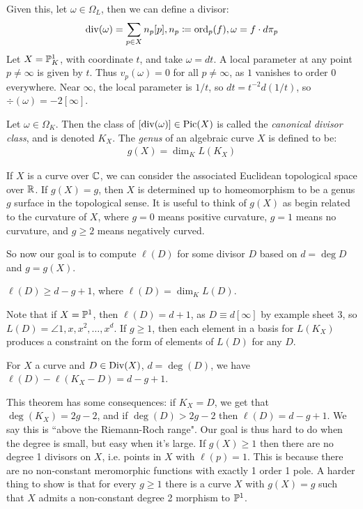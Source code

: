 \documentclass[10pt,a4paper,rgb]{article}
\begin{document}
Given this, let $\omega \in \Omega_L$, then we can define a divisor:
\begin{align*}
\div(\omega) = \sum_{p \in X} n_p[p], n_p \coloneqq \ord_p(f), \omega = f\cdot d\pi_p
\end{align*}
\hspace{1em}\example Let $X = \P_K^1$, with coordinate $t$, and take $\omega = dt$. A local parameter at any point $p \neq \infty$ is given by $t$. Thus $v_p(\omega) = 0$ for all $p \neq \infty$, as $1$ vanishes to order 0 everywhere. Near $\infty$, the local parameter is $1/t$, so $dt = t^{-2}d(1/t)$, so $\div(\omega) = -2[\infty]$.

Let $\omega \in \Omega_K$. Then the class of $[\div(\omega)] \in \Pic(X)$ is called the \emph{canonical divisor class}, and is denoted $K_X$. The \emph{genus} of an algebraic curve $X$ is defined to be:
\begin{align*}
g(X) = \dim_K L(K_X)
\end{align*}

If $X$ is a curve over $\C$, we can consider the associated Euclidean topological space over $\R$. If $g(X) = g$, then $X$ is determined up to homeomorphism to be a genus $g$ surface in the topological sense. It is useful to think of $g(X)$ as begin related to the curvature of $X$, where $g=0$ means positive curvature, $g=1$ means no curvature, and $g\geq 2$ means negatively curved.

So now our goal is to compute $\ell(D)$ for some divisor $D$ based on $d = \deg D$ and $g = g(X)$.

\begin{theorem}[Riemann]
$\ell(D) \geq d-g+1$, where $\ell(D) = \dim_K L(D)$.
\end{theorem}
Note that if $X = \P^1$, then $\ell(D) = d+1$, as $D \equiv d[\infty]$ by example sheet 3, so $L(D) = \angle{1, x, x^2, \ldots, x^d}$. If $g \geq 1$, then each element in a basis for $L(K_X)$ produces a constraint on the form of elements of $L(D)$ for any $D$.

\begin{theorem}
For $X$ a curve and $D \in \Div(X)$, $d = \deg(D)$, we have $\ell(D) - \ell(K_X - D) = d-g+1$.
\end{theorem}
This theorem has some consequences: if $K_X = D$, we get that $\deg(K_X) = 2g-2$, and if $\deg(D) > 2g-2$ then $\ell(D) = d-g+1$. We say this is ``above the Riemann-Roch range". Our goal is thus hard to do when the degree is small, but easy when it's large. If $g(X) \geq 1$ then there are no degree 1 divisors on $X$, i.e. points in $X$ with $\ell(p) = 1$. This is because there are no non-constant meromorphic functions with exactly 1 order 1 pole. A harder thing to show is that for every $g \geq 1$ there is a curve $X$ with $g(X) = g$ such that $X$ admits a non-constant degree 2 morphism to $\P^1$.
\end{document}
